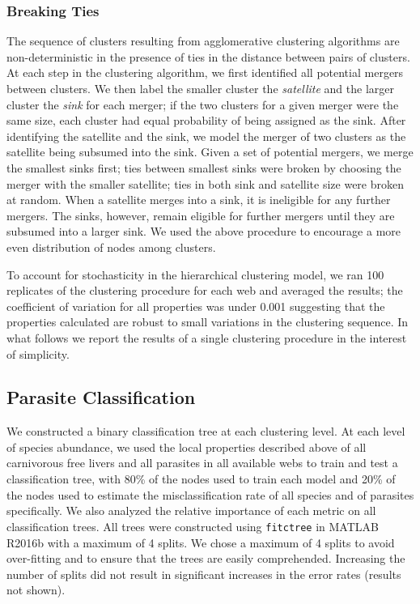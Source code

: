 \documentclass[../dissertation.tex]{subfiles}
\begin{document}
\subsubsection{Breaking Ties} The sequence of clusters resulting from
agglomerative clustering algorithms are non-deterministic in the presence of
ties in the distance between pairs of clusters. At each step in the clustering
algorithm, we first identified all potential mergers between clusters. We then
label the smaller cluster the \textit{satellite} and the larger cluster the
\textit{sink} for each merger; if the two clusters for a given merger were the
same size, each cluster had equal probability of being assigned as the sink.
After identifying the satellite and the sink, we model the merger of two
clusters as the satellite being subsumed into the sink. Given a set of
potential mergers, we merge the smallest sinks first; ties between smallest
sinks were broken by choosing the merger with the smaller satellite; ties in
both sink and satellite size were broken at random. When a satellite merges
into a sink, it is ineligible for any further mergers. The sinks, however,
remain eligible for further mergers until they are subsumed into a larger sink.
We used the above procedure to encourage a more even distribution of nodes
among clusters. 

To account for stochasticity in the hierarchical clustering model, we ran 100
replicates of the clustering procedure for each web and averaged the results;
the coefficient of variation for all properties was under 0.001 suggesting that
the properties calculated are robust to small variations in the clustering
sequence. In what follows we report the results of a single clustering
procedure in the interest of simplicity.


\subsection{Parasite Classification} We constructed a binary classification
tree at each clustering level. At each level of species abundance, we used the
local properties described above of all carnivorous free livers and all
parasites in all available webs to train and test a classification tree, with
80\% of the nodes used to train each model and 20\% of the nodes used to
estimate the misclassification rate of all species and of parasites
specifically. We also analyzed the relative importance of each metric on all
classification trees. All trees were constructed using \verb|fitctree| in
MATLAB R2016b with a maximum of 4 splits. We chose a maximum of 4 splits to
avoid over-fitting and to ensure that the trees are easily comprehended.
Increasing the number of splits did not result in significant increases in the
error rates (results not shown).
\end{document}
